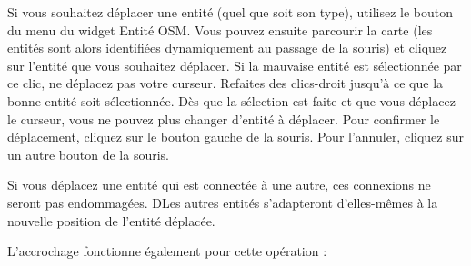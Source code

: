 Si vous souhaitez déplacer une entité (quel que soit son type), utilisez le bouton  du menu du widget Entité OSM. Vous pouvez ensuite parcourir la carte (les entités sont alors identifiées dynamiquement au passage de la souris) et cliquez sur l'entité que vous souhaitez déplacer. Si la mauvaise entité est sélectionnée par ce clic, ne déplacez pas votre curseur. Refaites des clics-droit jusqu'à ce que la bonne entité soit sélectionnée. Dès que la sélection est faite et que vous déplacez le curseur, vous ne pouvez plus changer d'entité à déplacer. Pour confirmer le déplacement, cliquez sur le bouton gauche de la souris. Pour l'annuler, cliquez sur un autre bouton de la souris.

Si vous déplacez une entité qui est connectée à une autre, ces connexions ne seront pas endommagées. DLes autres entités s'adapteront d'elles-mêmes à la nouvelle position de l'entité déplacée.

L'accrochage fonctionne également pour cette opération :

